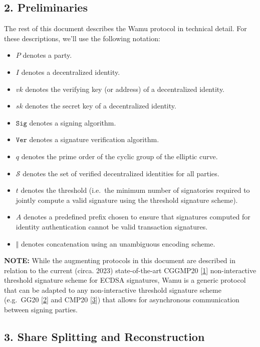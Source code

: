 \documentclass[
]{article}
\providecommand{\tightlist}{%
  \setlength{\itemsep}{0pt}\setlength{\parskip}{0pt}}
\begin{document}
\hypertarget{preliminaries}{%
\subsection{2. Preliminaries}\label{preliminaries}}

The rest of this document describes the Wamu protocol in technical
detail. For these descriptions, we'll use the following notation:

\begin{itemize}
\tightlist
\item
  \(P\) denotes a party.
\item
  \(I\) denotes a decentralized identity.
\item
  \(vk\) denotes the verifying key (or address) of a decentralized
  identity.
\item
  \(sk\) denotes the secret key of a decentralized identity.
\item
  \(\mathtt{Sig}\) denotes a signing algorithm.
\item
  \(\mathtt{Ver}\) denotes a signature verification algorithm.
\item
  \(q\) denotes the prime order of the cyclic group of the elliptic
  curve.
\item
  \(\mathcal{S}\) denotes the set of verified decentralized identities
  for all parties.
\item
  \(t\) denotes the threshold (i.e.~the minimum number of signatories
  required to jointly compute a valid signature using the threshold
  signature scheme).
\item
  \(A\) denotes a predefined prefix chosen to ensure that signatures
  computed for identity authentication cannot be valid transaction
  signatures.
\item
  \(\Vert\) denotes concatenation using an unambiguous encoding scheme.
\end{itemize}

\textbf{NOTE:} While the augmenting protocols in this document are
described in relation to the current (circa. 2023) state-of-the-art
CGGMP20 {[}\protect\hyperlink{ref-cggmp20}{1}{]} non-interactive
threshold signature scheme for ECDSA signatures, Wamu is a generic
protocol that can be adapted to any non-interactive threshold signature
scheme (e.g.~GG20 {[}\protect\hyperlink{ref-gg20}{2}{]} and CMP20
{[}\protect\hyperlink{ref-cmp20}{3}{]}) that allows for asynchronous
communication between signing parties.

\hypertarget{share-splitting-and-reconstruction}{%
\subsection{3. Share Splitting and
Reconstruction}\label{share-splitting-and-reconstruction}}
\end{document}
